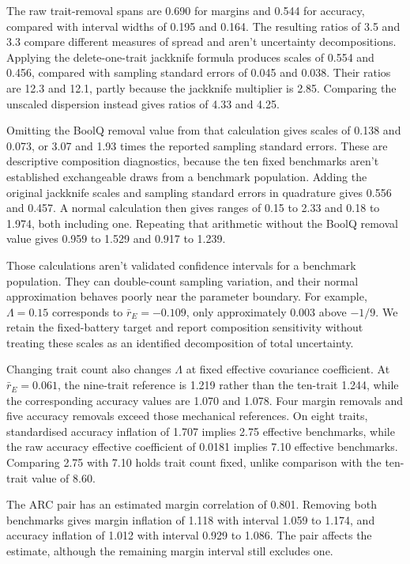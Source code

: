 The raw trait-removal spans are 0.690 for margins and 0.544 for accuracy, compared with interval widths of 0.195 and 0.164. The resulting ratios of 3.5 and 3.3 compare different measures of spread and aren't uncertainty decompositions. Applying the delete-one-trait jackknife formula produces scales of 0.554 and 0.456, compared with sampling standard errors of 0.045 and 0.038. Their ratios are 12.3 and 12.1, partly because the jackknife multiplier is 2.85. Comparing the unscaled dispersion instead gives ratios of 4.33 and 4.25.

Omitting the BoolQ removal value from that calculation gives scales of 0.138 and 0.073, or 3.07 and 1.93 times the reported sampling standard errors. These are descriptive composition diagnostics, because the ten fixed benchmarks aren't established exchangeable draws from a benchmark population. Adding the original jackknife scales and sampling standard errors in quadrature gives 0.556 and 0.457. A normal calculation then gives ranges of 0.15 to 2.33 and 0.18 to 1.974, both including one. Repeating that arithmetic without the BoolQ removal value gives 0.959 to 1.529 and 0.917 to 1.239.

Those calculations aren't validated confidence intervals for a benchmark population. They can double-count sampling variation, and their normal approximation behaves poorly near the parameter boundary. For example, $\Lambda=0.15$ corresponds to $\bar r_E=-0.109$, only approximately 0.003 above $-1/9$. We retain the fixed-battery target and report composition sensitivity without treating these scales as an identified decomposition of total uncertainty.

Changing trait count also changes $\Lambda$ at fixed effective covariance coefficient. At $\bar r_E=0.061$, the nine-trait reference is 1.219 rather than the ten-trait 1.244, while the corresponding accuracy values are 1.070 and 1.078. Four margin removals and five accuracy removals exceed those mechanical references. On eight traits, standardised accuracy inflation of 1.707 implies 2.75 effective benchmarks, while the raw accuracy effective coefficient of 0.0181 implies 7.10 effective benchmarks. Comparing 2.75 with 7.10 holds trait count fixed, unlike comparison with the ten-trait value of 8.60.

The ARC pair has an estimated margin correlation of 0.801. Removing both benchmarks gives margin inflation of 1.118 with interval 1.059 to 1.174, and accuracy inflation of 1.012 with interval 0.929 to 1.086. The pair affects the estimate, although the remaining margin interval still excludes one.

